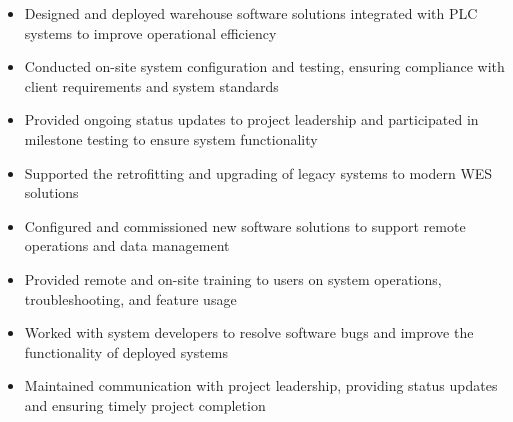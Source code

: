 \par\smallskip
\begin{minipage}{13.75cm}
  \begin{minipage}{6.5cm}
    \begin{itemize}
      \item Designed and deployed warehouse software solutions integrated with PLC systems to improve operational efficiency
      \item Conducted on-site system configuration and testing, ensuring compliance with client requirements and system standards
    \end{itemize}
  \end{minipage}
  \hfill
  \begin{minipage}{6.5cm}
    \begin{itemize}
      \item Provided ongoing status updates to project leadership and participated in milestone testing to ensure system functionality
      \item Supported the retrofitting and upgrading of legacy systems to modern WES solutions
    \end{itemize}
  \end{minipage}
\end{minipage}
\par\smallskip
\divider

\par\smallskip
\begin{minipage}{13.75cm}
  \begin{minipage}{6.5cm}
    \begin{itemize}
      \item Configured and commissioned new software solutions to support remote operations and data management
      \item Provided remote and on-site training to users on system operations, troubleshooting, and feature usage
    \end{itemize}
  \end{minipage}
  \hfill
  \begin{minipage}{6.5cm}
    \begin{itemize}
      \item Worked with system developers to resolve software bugs and improve the functionality of deployed systems
      \item Maintained communication with project leadership, providing status updates and ensuring timely project completion
    \end{itemize}
  \end{minipage}
\end{minipage}

